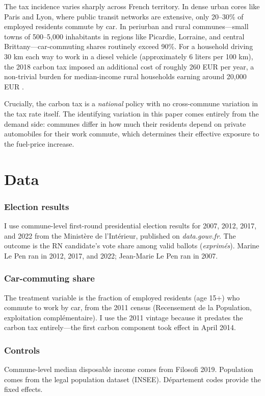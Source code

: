 \documentclass[12pt]{article}
\begin{document}
The tax incidence varies sharply across French territory. In dense urban cores like Paris and Lyon, where public transit networks are extensive, only 20--30\% of employed residents commute by car. In periurban and rural communes---small towns of 500--5,000 inhabitants in regions like Picardie, Lorraine, and central Brittany---car-commuting shares routinely exceed 90\%. For a household driving 30 km each way to work in a diesel vehicle (approximately 6 liters per 100 km), the 2018 carbon tax imposed an additional cost of roughly 260 EUR per year, a non-trivial burden for median-income rural households earning around 20,000 EUR \citep{douenne2022yellow}.

Crucially, the carbon tax is a \textit{national} policy with no cross-commune variation in the tax rate itself. The identifying variation in this paper comes entirely from the demand side: communes differ in how much their residents depend on private automobiles for their work commute, which determines their effective exposure to the fuel-price increase.


\section{Data}
\label{sec:data}

\subsubsection*{Election results} I use commune-level first-round presidential election results for 2007, 2012, 2017, and 2022 from the Minist\`{e}re de l'Int\'{e}rieur, published on \textit{data.gouv.fr}. The outcome is the RN candidate's vote share among valid ballots (\textit{exprim\'{e}s}). Marine Le Pen ran in 2012, 2017, and 2022; Jean-Marie Le Pen ran in 2007.

\subsubsection*{Car-commuting share} The treatment variable is the fraction of employed residents (age 15+) who commute to work by car, from the 2011 census (Recensement de la Population, exploitation compl\'{e}mentaire). I use the 2011 vintage because it predates the carbon tax entirely---the first carbon component took effect in April 2014.

\subsubsection*{Controls} Commune-level median disposable income comes from Filosofi 2019. Population comes from the legal population dataset (INSEE). D\'{e}partement codes provide the fixed effects.
\end{document}
